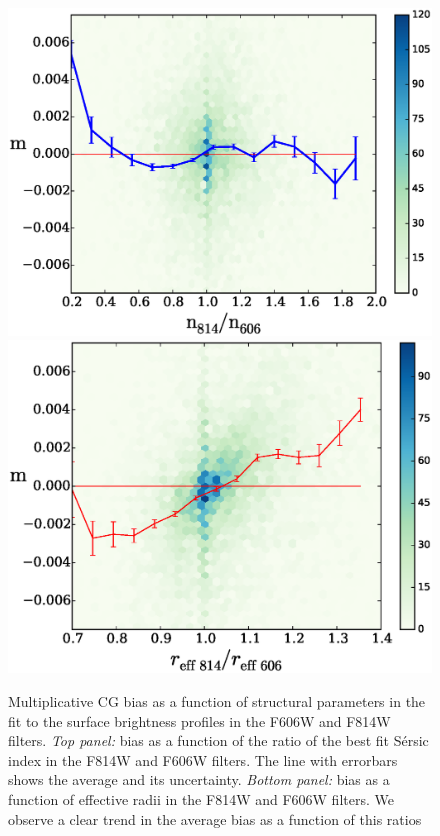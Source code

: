 \documentclass[useAMS,usenatbib]{mnras}
\begin{document}
\begin{figure}
\includegraphics[width=\hsize]{zcgbheat-ne29.eps}
\includegraphics[width=\hsize]{zcgbheat-re29.eps}
\caption{Multiplicative CG bias as a function of structural parameters in the fit to the surface brightness
profiles in the F606W and F814W filters. {\it Top panel:} bias as a function
of the ratio of the best fit S{\'e}rsic index in the F814W and F606W filters. The line with
errorbars shows the average and its uncertainty. {\it Bottom panel:} bias as a function of effective
radii in the F814W and F606W filters. We observe a clear trend in the average bias as a function of
this ratios}
\label{fig:cg2fitpar}
\end{figure}
\end{document}
